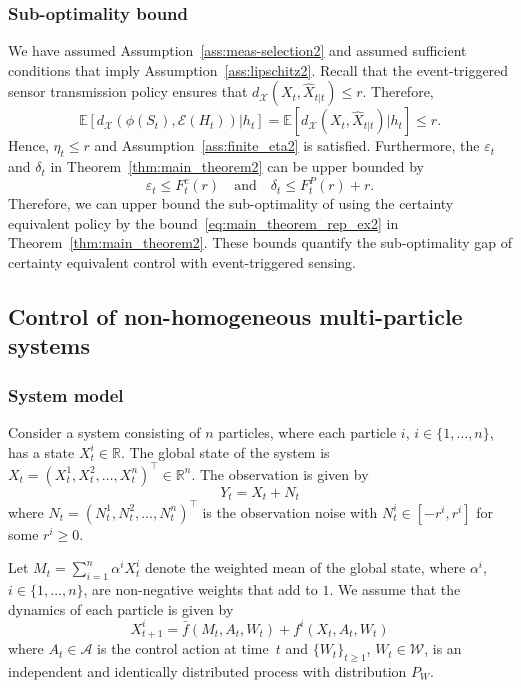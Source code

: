 \documentclass[letterpaper, 10pt]{IEEEtran}
\theoremstyle{plain}
\theoremstyle{nonumberplain}
\theoremstyle{plain}
\newcommand*\ALPHABET{\mathcal}
\newcommand*\EXP{\mathds{E}}
\newcommand*\reals{\mathds{R}}
\newcommand{\TRANS}{\intercal}
\newcommand\EST{\mathcal{E}}
\begin{document}
\subsubsection{Sub-optimality bound}
We have assumed Assumption~\ref{ass:meas-selection2} and assumed sufficient conditions that imply Assumption~\ref{ass:lipschitz2}. 
Recall that the event-triggered sensor transmission policy ensures that $d_{\ALPHABET X}(X_t, \hat X_{t|t}) \le r$.
Therefore,
\[
    \EXP[d_{\ALPHABET X}(\phi(S_t),\EST(H_t))|h_t] = \EXP[d_{\ALPHABET X}(X_t, \hat X_{t|t}) | h_t] \leq r.
\]
Hence, $\eta_t \leq r$ and Assumption~\ref{ass:finite_eta2} is satisfied.  Furthermore, the $\varepsilon_t$ and $\delta_t$ in Theorem~\ref{thm:main_theorem2} can be upper bounded by
\[
    \varepsilon_t \leq F_t^c(r)
    \quad\text{and}\quad
    \delta_t \leq F_t^P(r) + r. 
\]
Therefore, we can upper bound the sub-optimality of using the certainty equivalent policy by the bound~\eqref{eq:main_theorem_rep_ex2} in Theorem~\ref{thm:main_theorem2}. These bounds quantify the sub-optimality gap of certainty equivalent control with event-triggered sensing.

\subsection{Control of non-homogeneous multi-particle systems}

\subsubsection{System model}
Consider a system consisting of $n$ particles, where each particle $i$, $i \in \{1, \dots, n\}$, has a state $X^i_t \in \reals$. The global state of the system is $X_t = (X^1_t, X^2_t, \ldots, X^n_t)^\TRANS \in \reals^n$. The observation is given by 
\[
    Y_t = X_t + N_t
\]
where $N_t = (N^1_t, N^2_t, \ldots, N^n_t)^\TRANS $ is the observation noise with $N^i_t \in [-r^i,r^i]$ for some $r^i \ge 0$.

Let $M_t = \sum_{i=1}^n \alpha^i X^i_t$ denote the weighted mean of the global state, where $\alpha^i$, $i \in \{1, \dots, n\}$, are non-negative weights that add to $1$.  We assume that the dynamics of each particle is given by
\begin{equation}\label{eq:mean-field-dynamics}
    X_{t+1}^i = \bar f(M_t,A_t, W_t) + f^i(X_t,A_t,W_t)
\end{equation}
where $A_t \in \ALPHABET A$ is the control action at time~$t$ and $\{W_t\}_{t \ge 1}$, $W_t \in \ALPHABET W$, is an independent and identically distributed process with distribution $P_W$. 
\end{document}
